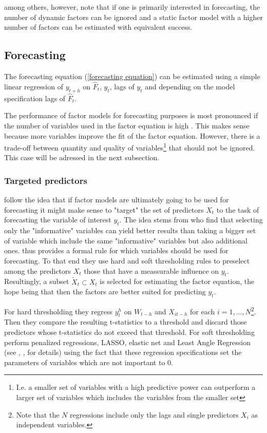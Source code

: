 \documentclass[12pt]{article}
\begin{document}
\citet{breitung2011testing} among others, however, note that if one is primarily interested in forecasting, the number of dynamic factors can be ignored and a static factor model with a higher number of factors can be estimated with equivalent success.


\subsection{Forecasting}
The forecasting equation (\ref{forecasting equation}) can be estimated using a simple linear regression of $y_{t+h}$ on $\hat F_t$, $y_t$, lags of $y_t$ and depending on the model specification lags of $\hat F_t$.

The performance of factor models for forecasting purposes is most pronounced if the number of variables used in the factor equation is high \citep{stock2011dynamic}. This makes sense because more variables improve the fit of the factor equation. However, there is a trade-off between quantity and quality of variables\footnote{I.e. a smaller set of variables with a high predictive power can outperform a larger set of variables which includes the variables from the smaller set} that should not be ignored. This case will be adressed in the next subsection.

\subsubsection{Targeted predictors}
\citet{bai2008forecasting} follow the idea that if factor models are ultimately going to be used for forecasting it might make sense to "target" the set of predictors $X_t$ to the task of forecasting the variable of interest $y_t$. The idea stems from \citet{boivin2006more} who find that selecting only the "informative" variables can yield better results than taking a bigger set of variable which include the same "informative" variables but also additional ones. \citet{bai2008forecasting} thus provides a formal rule for which variables should be used for forecasting. To that end they use hard and soft thresholding rules to preselect among the predictors $X_t$ those that have a meassurable influence on $y_t$. Resultingly, a subset $\tilde X_t \subset X_t$ is selected for estimating the factor equation, the hope being that then the factors are better suited for predicting $y_t$.

 For hard thresholding they regress $y_t^h$ on $W_{t-h}$ and $X_{it-h}$ for each $i=1, ..., N$\footnote{Note that the $N$ regressions include only the lags and single predictors $X_i$ as independent variables.}. Then they compare the resulting t-statistics to a threshold and discard those predictors whose t-statistics do not exceed that threshold. For soft thresholding \citet{bai2008forecasting} perform penalized regressions, LASSO, elastic net and Least Angle Regression (see \citet{tibshirani1996}, \citet{zou_hastie2005}, \citet{efron_hastie_johnstone_tibshirani2004} for details) using the fact that these regression specifications set the parameters of variables which are not important to $0$. \\
\end{document}
